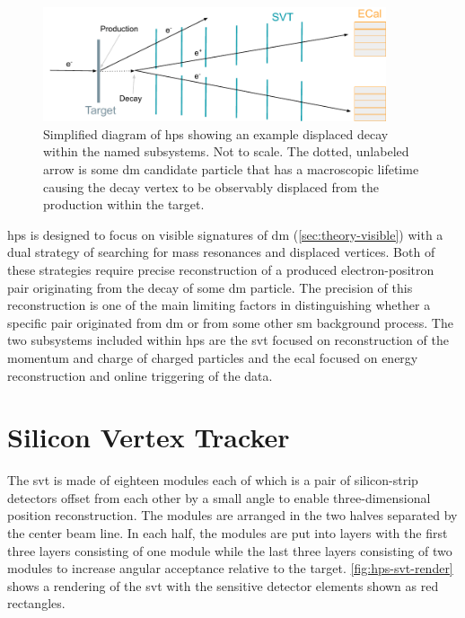 \begin{figure}
	\centering
	\includegraphics[width=0.9\textwidth]{figures/hps/experiment/hps-diagram.pdf}
	\caption{
		Simplified diagram of \ac{hps} showing an example displaced decay within the named subsystems.
		Not to scale.
		The dotted, unlabeled arrow is some \ac{dm} candidate particle that has a macroscopic lifetime causing
		the decay vertex to be observably displaced from the production within the target.
	}
	\label{fig:hps-diagram}
\end{figure}

\ac{hps} is designed to focus on visible signatures of \ac{dm} (\cref{sec:theory-visible}) with
a dual strategy of searching for mass resonances and displaced vertices. Both of these strategies
require precise reconstruction of a produced electron-positron pair originating from the decay of
some \ac{dm} particle. The precision of this reconstruction is one of the main limiting factors
in distinguishing whether a specific pair originated from \ac{dm} or from some other \ac{sm}
background process. The two subsystems included within \ac{hps} are the \ac{svt} focused
on reconstruction of the momentum and charge of charged particles
and the \ac{ecal} focused on energy reconstruction and online triggering of the data.

\section{Silicon Vertex Tracker}
The \ac{svt} is made of eighteen modules each of which is a pair of silicon-strip detectors
offset from each other by a small angle to enable three-dimensional position reconstruction.
The modules are arranged in the two halves separated by the center beam line. In each half,
the modules are put into layers with the first three layers consisting of one module while
the last three layers consisting of two modules to increase angular acceptance relative
to the target. \cref{fig:hps-svt-render} shows a rendering of the \ac{svt} with the sensitive
detector elements shown as red rectangles.

